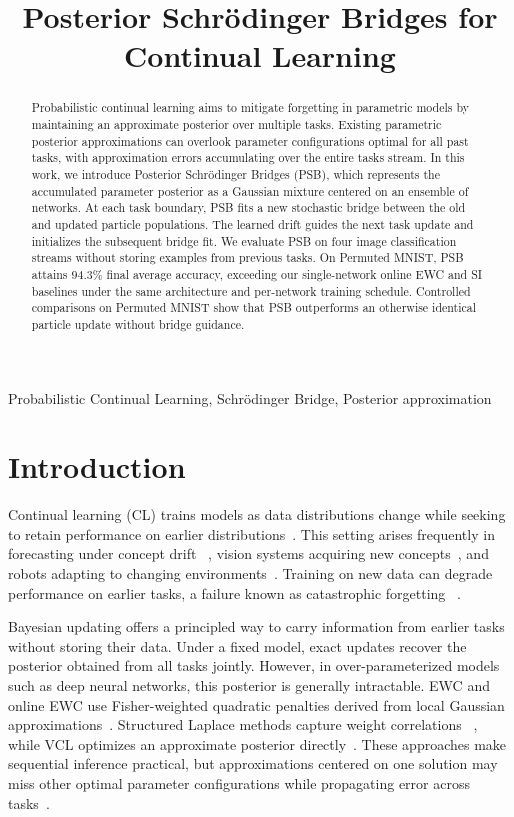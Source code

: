 \documentclass{article}
\title{Posterior Schrödinger Bridges for Continual Learning}
\begin{document}
\ninept
%
\maketitle
%
\begin{abstract}
Probabilistic continual learning aims to mitigate forgetting in parametric models by maintaining an approximate posterior over multiple tasks. Existing parametric posterior approximations can overlook parameter configurations optimal for all past tasks, with approximation errors accumulating over the entire tasks stream. In this work, we introduce Posterior Schr\"odinger Bridges (PSB), which represents the accumulated parameter posterior as a Gaussian mixture centered on an ensemble of networks. At each task boundary, PSB fits a new stochastic bridge between the old and updated particle populations. The learned drift guides the next task update and initializes the subsequent bridge fit. We evaluate PSB on four image classification streams without storing examples from previous tasks. On Permuted MNIST, PSB attains $94.3\%$ final average accuracy, exceeding our single-network online EWC and SI baselines under the same architecture and per-network training schedule. Controlled comparisons on Permuted MNIST show that PSB outperforms an otherwise identical particle update without bridge guidance.
\end{abstract}
%
\begin{keywords}
Probabilistic Continual Learning, Schr\"odinger Bridge, Posterior approximation
\end{keywords}
%
\section{Introduction}
\label{sec:intro}

Continual learning (CL) trains models as data distributions change while
seeking to retain performance on earlier distributions~\cite{vandeven2022types}.
This setting arises frequently in forecasting under concept drift ~\cite{osti_10695974,pham2023fsnet}, vision systems acquiring new concepts~\cite{rebuffi2017icarl,aljundi2019taskfree,mai2022online}, and robots adapting to changing environments~\cite{lesort2020robotics}.
Training on new data can degrade performance on earlier tasks, a failure known as catastrophic forgetting ~\cite{mccloskey1989catastrophic}.

Bayesian updating offers a principled way to carry information from
earlier tasks without storing their data. Under a fixed model, exact
updates recover the posterior obtained from all tasks jointly. However, in over-parameterized models such as deep neural networks, this posterior is generally intractable. EWC and online EWC use
Fisher-weighted quadratic penalties derived from local Gaussian
approximations~\cite{kirkpatrick2017ewc,schwarz2018progress}.
Structured Laplace methods capture weight correlations
~\cite{ritter2018laplace}, while VCL optimizes an approximate posterior
directly~\cite{nguyen2018vcl}. These approaches make sequential
inference practical, but approximations centered on one solution may
miss other optimal parameter configurations while propagating error
across tasks~\cite{wilson2020bayesian,kessler2023sequential}.
\end{document}
